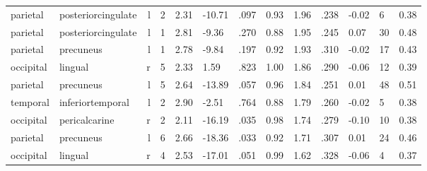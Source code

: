 \documentclass{article}
\begin{document}
\begin{longtable}{llrR{1.3cm}R{1cm}R{1.3cm}R{1cm}R{1cm}R{1.3cm}R{1cm}R{1.8cm}R{1.3cm}R{1.8cm}}
  parietal &        posteriorcingulate &    l &         2 &                  2.31 &           -10.71 &               .097 &                               0.93 &                          1.96 &                            .238 &  -0.02 &      6 &      0.38 \\
  parietal &        posteriorcingulate &    l &         1 &                  2.81 &            -9.36 &               .270 &                               0.88 &                          1.95 &                            .245 &   0.07 &     30 &      0.48 \\
  parietal &                 precuneus &    l &         1 &                  2.78 &            -9.84 &               .197 &                               0.92 &                          1.93 &                            .310 &  -0.02 &     17 &      0.43 \\
 occipital &                   lingual &    r &         5 &                  2.33 &             1.59 &               .823 &                               1.00 &                          1.86 &                            .290 &  -0.06 &     12 &      0.39 \\
  parietal &                 precuneus &    l &         5 &                  2.64 &           -13.89 &               .057 &                               0.96 &                          1.84 &                            .251 &   0.01 &     48 &      0.51 \\
  temporal &          inferiortemporal &    l &         2 &                  2.90 &            -2.51 &               .764 &                               0.88 &                          1.79 &                            .260 &  -0.02 &      5 &      0.38 \\
 occipital &             pericalcarine &    r &         2 &                  2.11 &           -16.19 &               .035 &                               0.98 &                          1.74 &                            .279 &  -0.10 &     10 &      0.38 \\
  parietal &                 precuneus &    l &         6 &                  2.66 &           -18.36 &               .033 &                               0.92 &                          1.71 &                            .307 &   0.01 &     24 &      0.46 \\
 occipital &                   lingual &    r &         4 &                  2.53 &           -17.01 &               .051 &                               0.99 &                          1.62 &                            .328 &  -0.06 &      4 &      0.37 \\

\end{longtable}
\end{document}
